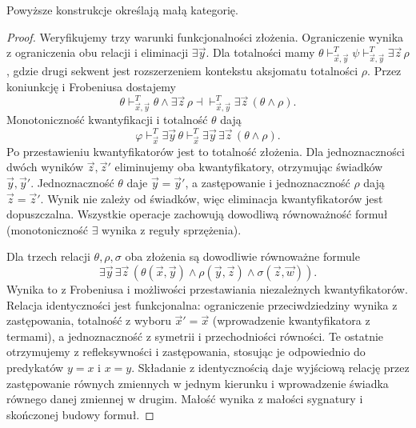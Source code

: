 \begin{stwierdzenie}\label{cat:prop:cl-syntactic-category}
Powyższe konstrukcje określają małą kategorię.
\end{stwierdzenie}
\begin{proof}
Weryfikujemy trzy warunki funkcjonalności złożenia. Ograniczenie wynika z ograniczenia obu relacji i eliminacji $\exists\vec y$. Dla totalności mamy $\theta\vdash_{\vec x,\vec y}^T\psi\vdash_{\vec x,\vec y}^T\exists\vec z\,\rho$, gdzie drugi sekwent jest rozszerzeniem kontekstu aksjomatu totalności $\rho$. Przez koniunkcję i Frobeniusa dostajemy
\[
 \theta\vdash_{\vec x,\vec y}^T
 \theta\wedge\exists\vec z\,\rho
 \dashv\vdash_{\vec x,\vec y}^T
 \exists\vec z\,(\theta\wedge\rho).
\]
Monotoniczność kwantyfikacji i totalność $\theta$ dają
\[
 \varphi\vdash_{\vec x}^T\exists\vec y\,\theta
 \vdash_{\vec x}^T\exists\vec y\,\exists\vec z\,(\theta\wedge\rho).
\]
Po przestawieniu kwantyfikatorów jest to totalność złożenia. Dla jednoznaczności dwóch wyników $\vec z,\vec z'$ eliminujemy oba kwantyfikatory, otrzymując świadków $\vec y,\vec y'$. Jednoznaczność $\theta$ daje $\vec y=\vec y'$, a zastępowanie i jednoznaczność $\rho$ dają $\vec z=\vec z'$. Wynik nie zależy od świadków, więc eliminacja kwantyfikatorów jest dopuszczalna. Wszystkie operacje zachowują dowodliwą równoważność formuł (monotoniczność $\exists$ wynika z reguły sprzężenia).
 
Dla trzech relacji $\theta,\rho,\sigma$ oba złożenia są dowodliwie równoważne formule
\[
 \exists\vec y\,\exists\vec z\,
 (\theta(\vec x,\vec y)\wedge\rho(\vec y,\vec z)\wedge\sigma(\vec z,\vec w)).
\]
Wynika to z Frobeniusa i możliwości przestawiania niezależnych kwantyfikatorów. Relacja identyczności jest funkcjonalna: ograniczenie przeciwdziedziny wynika z zastępowania, totalność z wyboru $\vec x'=\vec x$ (wprowadzenie kwantyfikatora z termami), a jednoznaczność z symetrii i przechodniości równości. Te ostatnie otrzymujemy z refleksywności i zastępowania, stosując je odpowiednio do predykatów $y=x$ i $x=y$. Składanie z identycznością daje wyjściową relację przez zastępowanie równych zmiennych w jednym kierunku i wprowadzenie świadka równego danej zmiennej w drugim. Małość wynika z małości sygnatury i skończonej budowy formuł.
\end{proof}

